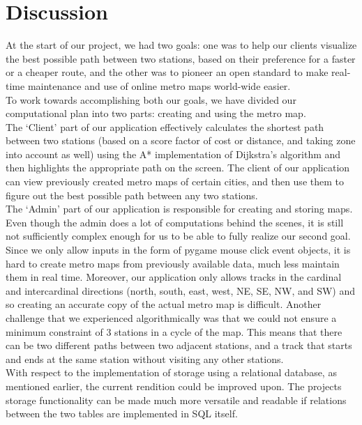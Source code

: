 \documentclass[fontsize=11pt]{article}
\begin{document}
    \section*{Discussion}
    At the start of our project, we had two goals: one was to help our clients visualize the best possible path between two stations, based on their preference for a faster or a cheaper route, and the other was to pioneer an open standard to make real-time maintenance and use of online metro maps world-wide easier. \\

    To work towards accomplishing both our goals, we have divided our computational plan into two parts: creating and using the metro map. \\

    The `Client' part of our application effectively calculates the shortest path between two stations (based on a score factor of cost or distance, and taking zone into account as well) using the A* implementation of Dijkstra's algorithm and then highlights the appropriate path on the screen. The client of our application can view previously created metro maps of certain cities, and then use them to figure out the best possible path between any two stations.\\

    The `Admin' part of our application is responsible for creating and storing maps. Even though the admin does a lot of computations behind the scenes, it is still not sufficiently complex enough for us to be able to fully realize our second goal. Since we only allow inputs in the form of pygame mouse click event objects, it is hard to create metro maps from previously available data, much less maintain them in real time. Moreover, our application only allows tracks in the cardinal and intercardinal directions (north, south, east, west, NE, SE, NW, and SW) and so creating an accurate copy of the actual metro map is difficult. Another challenge that we experienced algorithmically was that we could not ensure a minimum constraint of 3 stations in a cycle of the map. This means that there can be two different paths between two adjacent stations, and a track that starts and ends at the same station without visiting any other stations. \\

    With respect to the implementation of storage using a relational database, as mentioned earlier, the current rendition could be improved upon. The projects storage functionality can be made much more versatile and readable if relations between the two tables are implemented in SQL itself. \\
\end{document}
